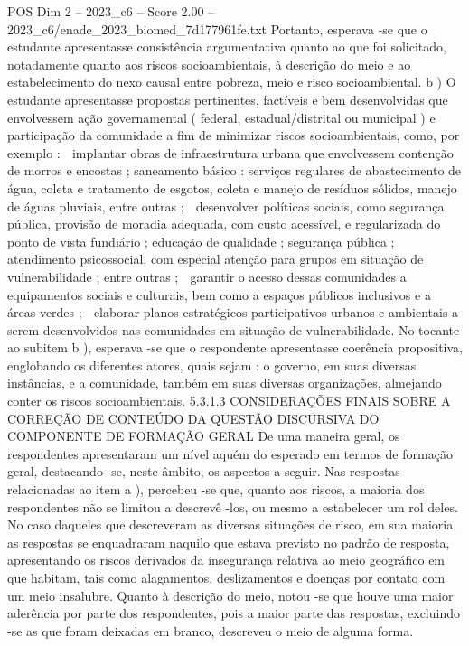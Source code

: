 \begin{textsample}{POS Dim 2 – 2023\_c6 – Score 2.00 – 2023\_c6/enade\_2023\_biomed\_7d177961fe.txt}
Portanto, esperava -se que o estudante apresentasse consistência argumentativa quanto ao que foi solicitado, notadamente quanto aos riscos socioambientais, à descrição do meio e ao estabelecimento do nexo causal entre pobreza, meio e risco socioambiental. b ) O estudante apresentasse propostas pertinentes, factíveis e bem desenvolvidas que envolvessem ação governamental ( federal, estadual/distrital ou municipal ) e participação da comunidade a fim de minimizar riscos socioambientais, como, por exemplo :  implantar obras de infraestrutura urbana que envolvessem contenção de morros e encostas ; saneamento básico : serviços regulares de abastecimento de água, coleta e tratamento de esgotos, coleta e manejo de resíduos sólidos, manejo de águas pluviais, entre outras ;  desenvolver políticas sociais, como segurança pública, provisão de moradia adequada, com custo acessível, e regularizada do ponto de vista fundiário ; educação de qualidade ; segurança pública ; atendimento psicossocial, com especial atenção para grupos em situação de vulnerabilidade ; entre outras ;  garantir o acesso dessas comunidades a equipamentos sociais e culturais, bem como a espaços públicos inclusivos e a áreas verdes ;  elaborar planos estratégicos participativos urbanos e ambientais a serem desenvolvidos nas comunidades em situação de vulnerabilidade.
No tocante ao subitem b ), esperava -se que o respondente apresentasse coerência propositiva, englobando os diferentes atores, quais sejam : o governo, em suas diversas instâncias, e a comunidade, também em suas diversas organizações, almejando conter os riscos socioambientais. 5.3.1.3 CONSIDERAÇÕES FINAIS SOBRE A CORREÇÃO DE CONTEÚDO DA QUESTÃO DISCURSIVA DO COMPONENTE DE FORMAÇÃO GERAL De uma maneira geral, os respondentes apresentaram um nível aquém do esperado em termos de formação geral, destacando -se, neste âmbito, os aspectos a seguir.
Nas respostas relacionadas ao item a ), percebeu -se que, quanto aos riscos, a maioria dos respondentes não se limitou a descrevê -los, ou mesmo a estabelecer um rol deles.
No caso daqueles que descreveram as diversas situações de risco, em sua maioria, as respostas se enquadraram naquilo que estava previsto no padrão de resposta, apresentando os riscos derivados da insegurança relativa ao meio geográfico em que habitam, tais como alagamentos, deslizamentos e doenças por contato com um meio insalubre.
Quanto à descrição do meio, notou -se que houve uma maior aderência por parte dos respondentes, pois a maior parte das respostas, excluindo -se as que foram deixadas em branco, descreveu o meio de alguma forma.

\end{textsample}
